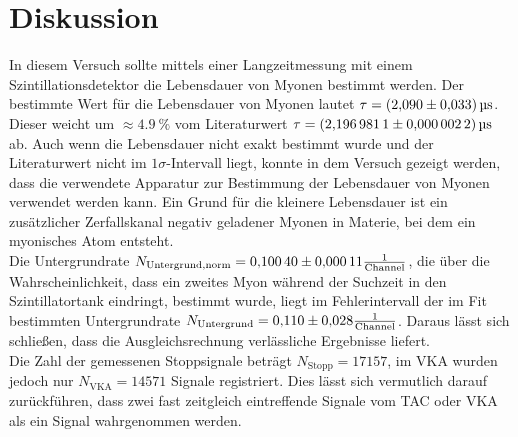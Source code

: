 \section{Diskussion}
In diesem Versuch sollte mittels einer Langzeitmessung mit einem Szintillationsdetektor die Lebensdauer von Myonen bestimmt werden. Der bestimmte Wert für die Lebensdauer von Myonen lautet $\tau = \SI{2.09 \pm 0.033}{\micro\second}$. Dieser weicht um $\approx \SI{4.9}{\percent}$ vom Literaturwert $\tau = \SI{2.1969811 \pm 0.0000022}{\micro\second}$\cite{ParticleDataGroup:2020ssz} ab. Auch wenn die Lebensdauer nicht exakt bestimmt wurde und der Literaturwert nicht im $1\sigma$-Intervall liegt, konnte in dem Versuch gezeigt werden, dass die verwendete Apparatur zur Bestimmung der Lebensdauer von Myonen verwendet werden kann. Ein Grund für die kleinere Lebensdauer ist ein zusätzlicher Zerfallskanal negativ geladener Myonen in Materie, bei dem ein myonisches Atom entsteht.\\
Die Untergrundrate $N_\mathrm{Untergrund,norm} = \num{0.1004 \pm 0.00011} \frac{1}{\mathrm{Channel}}$, die über die Wahrscheinlichkeit, dass ein zweites Myon während der Suchzeit in den Szintillatortank eindringt, bestimmt wurde, liegt im Fehlerintervall der im Fit bestimmten Untergrundrate $N_\mathrm{Untergrund} = \num{0.11 \pm 0.028} \frac{1}{\mathrm{Channel}}$. Daraus lässt sich schließen, dass die Ausgleichsrechnung verlässliche Ergebnisse liefert.\\
Die Zahl der gemessenen Stoppsignale beträgt $N_\mathrm{Stopp} = \num{17157}$, im VKA wurden jedoch nur $N_\mathrm{VKA} = \num{14571}$ Signale registriert. Dies lässt sich vermutlich darauf zurückführen, dass zwei fast zeitgleich eintreffende Signale vom TAC oder VKA als ein Signal wahrgenommen werden.
